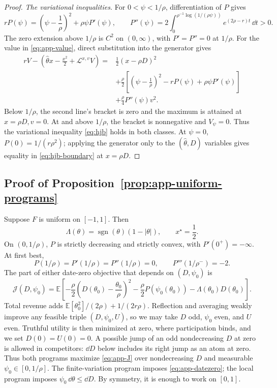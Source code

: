 \documentclass[12pt]{article}
\newcommand{\E}{\mathbb{E}}
\newcommand{\hth}{\hat\theta}
\begin{document}
\begin{proof}
\emph{The variational inequalities.}
For \(0<\psi<1/\rho\), differentiation of \(P\) gives
\begin{equation}\label{eq:app-P-ode}
  rP(\psi)=\left(\psi-\frac1\rho\right)^2
             +\rho\psi P'(\psi),
  \qquad
  P''(\psi)=2\int_0^{\rho^{-1}\log(1/(\rho\psi))}
                   e^{(2\rho-r)t}\,\dd t>0.
\end{equation}
The zero extension above \(1/\rho\) is \(C^2\) on \((0,\infty)\),
with \(P'=P''=0\) at \(1/\rho\). For the value in
\eqref{eq:app-value}, direct substitution into the generator gives
\[
\begin{split}
  rV-\left(\hth x-\frac{x^2}{2}+\mathcal L^{x,v}V\right)
  ={}&\frac12(x-\rho D)^2\\
  &+\frac{\rho}{2}
   \left[\left(\psi-\frac1\rho\right)^2-rP(\psi)
                 +\rho\psi P'(\psi)\right]
    \\
  &+\frac{\rho}{4}P''(\psi)v^2 .
\end{split}
\]
Below \(1/\rho\), the second line's bracket is zero and the maximum
is attained at \(x=\rho D,v=0\). At and above \(1/\rho\), the
bracket is nonnegative and \(V_\psi=0\). Thus the variational
inequality \eqref{eq:hjb} holds in both classes. At \(\psi=0\),
\(P(0)=1/(r\rho^2)\); applying the generator only to the
\((\hth,D)\) variables gives equality in
\eqref{eq:hjb-boundary} at \(x=\rho D\).
\end{proof}

\subsection{Proof of Proposition~\ref{prop:app-uniform-programs}}
\label{app:structure-uniform}

Suppose \(F\) is uniform on \([-1,1]\). Then
\[
  \Lambda(\theta)=\operatorname{sgn}(\theta)(1-|\theta|),
  \qquad x^\star=\frac12.
\]
On \((0,1/\rho)\), \(P\) is strictly decreasing and strictly
convex, with \(P'(0^+)=-\infty\). At first best,
\[
  P(1/\rho)=P'(1/\rho)=P''(1/\rho)=0,
  \qquad P'''(1/\rho^-)=-2.
\]
The part of either date-zero objective that depends on \((D,\psi_0)\) is
\begin{equation}\label{eq:app-J}
  \mathcal J(D,\psi_0)
  =\E\left[-\frac{\rho}{2}
    \left(D(\theta_0)-\frac{\theta_0}{\rho}\right)^2
    -\frac{\rho}{2}P(\psi_0(\theta_0))
    -\Lambda(\theta_0)D(\theta_0)\right].
\end{equation}
Total revenue adds
\(\E[\theta_0^2]/(2\rho)+1/(2r\rho)\). Reflection and averaging weakly
improve any feasible triple \((D,\psi_0,U)\), so we may take \(D\) odd,
\(\psi_0\) even, and \(U\) even. Truthful utility is then minimized at
zero, where participation binds, and we set \(D(0)=U(0)=0\).
A possible jump of an odd nondecreasing \(D\) at zero is allowed in
competitors: \(\dd D\) below includes its right jump as an atom at zero. Thus both
programs maximize \eqref{eq:app-J} over nondecreasing \(D\) and measurable
\(\psi_0\in[0,1/\rho]\). The finite-variation program imposes
\eqref{eq:app-datezero}; the local program imposes
\(\psi_0\,\dd\theta\leq\dd D\).
By symmetry, it is enough to work on \([0,1]\).
\end{document}
